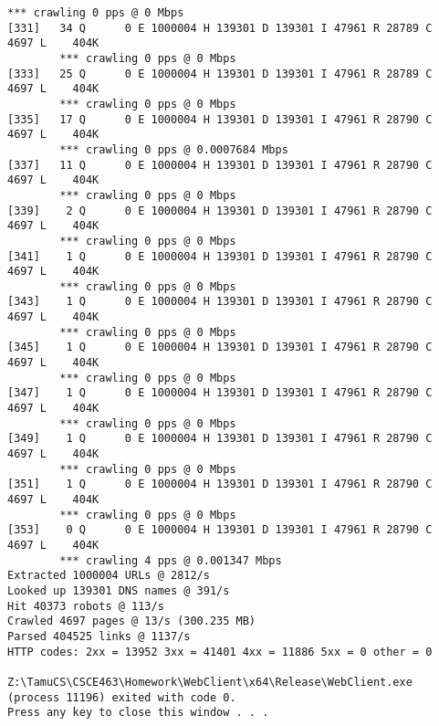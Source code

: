\documentclass[11pt]{article}
\begin{document}
\begin{lstlisting}[label=app-trace,caption=Output of Homework 1]
        *** crawling 0 pps @ 0 Mbps
[331]   34 Q      0 E 1000004 H 139301 D 139301 I 47961 R 28789 C  4697 L    404K
        *** crawling 0 pps @ 0 Mbps
[333]   25 Q      0 E 1000004 H 139301 D 139301 I 47961 R 28789 C  4697 L    404K
        *** crawling 0 pps @ 0 Mbps
[335]   17 Q      0 E 1000004 H 139301 D 139301 I 47961 R 28790 C  4697 L    404K
        *** crawling 0 pps @ 0.0007684 Mbps
[337]   11 Q      0 E 1000004 H 139301 D 139301 I 47961 R 28790 C  4697 L    404K
        *** crawling 0 pps @ 0 Mbps
[339]    2 Q      0 E 1000004 H 139301 D 139301 I 47961 R 28790 C  4697 L    404K
        *** crawling 0 pps @ 0 Mbps
[341]    1 Q      0 E 1000004 H 139301 D 139301 I 47961 R 28790 C  4697 L    404K
        *** crawling 0 pps @ 0 Mbps
[343]    1 Q      0 E 1000004 H 139301 D 139301 I 47961 R 28790 C  4697 L    404K
        *** crawling 0 pps @ 0 Mbps
[345]    1 Q      0 E 1000004 H 139301 D 139301 I 47961 R 28790 C  4697 L    404K
        *** crawling 0 pps @ 0 Mbps
[347]    1 Q      0 E 1000004 H 139301 D 139301 I 47961 R 28790 C  4697 L    404K
        *** crawling 0 pps @ 0 Mbps
[349]    1 Q      0 E 1000004 H 139301 D 139301 I 47961 R 28790 C  4697 L    404K
        *** crawling 0 pps @ 0 Mbps
[351]    1 Q      0 E 1000004 H 139301 D 139301 I 47961 R 28790 C  4697 L    404K
        *** crawling 0 pps @ 0 Mbps
[353]    0 Q      0 E 1000004 H 139301 D 139301 I 47961 R 28790 C  4697 L    404K
        *** crawling 4 pps @ 0.001347 Mbps
Extracted 1000004 URLs @ 2812/s
Looked up 139301 DNS names @ 391/s
Hit 40373 robots @ 113/s
Crawled 4697 pages @ 13/s (300.235 MB)
Parsed 404525 links @ 1137/s
HTTP codes: 2xx = 13952 3xx = 41401 4xx = 11886 5xx = 0 other = 0

Z:\TamuCS\CSCE463\Homework\WebClient\x64\Release\WebClient.exe (process 11196) exited with code 0.
Press any key to close this window . . .
\end{lstlisting}
\end{document}
